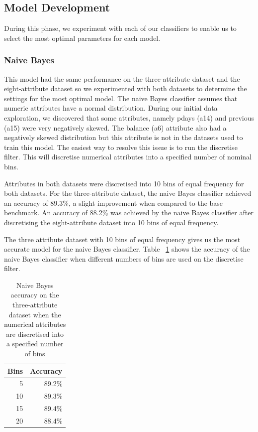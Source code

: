 \documentclass[a4paper,11pt]{article}
\begin{document}
\subsection{Model Development}

During this phase, we experiment with each of our classifiers to enable us to select the most optimal parameters
for each model.

\subsubsection{Naive Bayes}

This model had the same performance on the three-attribute dataset and the eight-attribute dataset so we experimented 
with both datasets to determine the settings for the most optimal model. The naive Bayes classifier
assumes that numeric attributes have a normal distribution. During our initial data exploration, we discovered
that some attributes, namely pdays (a14) and previous (a15) were very negatively skewed. The balance (a6) attribute
also had a negatively skewed distribution but this attribute is not in the datasets used to train this model. The
easiest way to resolve this issue is to run the discretise filter. This will discretise numerical attributes into
a specified number of nominal bins.

Attributes in both datasets were discretised into 10 bins of equal frequency for both datasets. For the three-attribute
dataset, the naive Bayes classifier achieved an accuracy of 89.3\%, a slight improvement when compared to the base benchmark.
An accuracy of 88.2\% was achieved by the naive Bayes classifier after discretising the eight-attribute dataset into
10 bins of equal frequency.

The three attribute dataset with 10 bins of equal frequency gives us the most accurate model for the naive Bayes
classifier. Table ~\ref{tab:naiveBayesBins} shows the accuracy of the naive Bayes classifier when different numbers of
bins are used on the discretise filter. 

\begin{table}[H]
  \begin{center}
    \begin{tabular}{r | r}
      Bins & Accuracy  \\ \hline
      5 & 89.2\% \\
      10 & 89.3\% \\
      15 & 89.4\% \\
      20 & 88.4\% \\
    \end{tabular}
  \end{center}
  \caption{Naive Bayes accuracy on the three-attribute dataset when the numerical attributes are discretised
  into a specified number of bins}
  \label{tab:naiveBayesBins}
\end{table}
\end{document}
